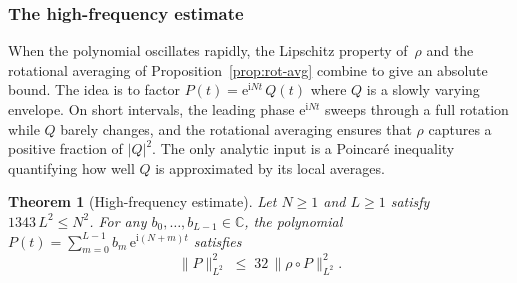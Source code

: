 \documentclass[11pt]{amsart}
\newtheorem{theorem}{Theorem}[section]
\theoremstyle{remark}
\begin{document}
\subsubsection{The high-frequency estimate}\label{sec:high-freq}

When the polynomial oscillates rapidly, the Lipschitz property
of~$\rho$ and the rotational averaging of
Proposition~\ref{prop:rot-avg} combine to give an absolute bound.  The idea
is to factor $P(t) = \mathrm{e}^{\mathrm{i} Nt}\, Q(t)$ where $Q$ is a slowly varying
envelope. On short intervals, the leading phase $\mathrm{e}^{\mathrm{i} Nt}$ sweeps through
a full rotation while $Q$ barely changes, and the rotational averaging
ensures that $\rho$ captures a positive fraction of $\lvert Q \rvert^2$.  The only
analytic input is a Poincar\'e inequality quantifying how well $Q$ is
approximated by its local averages.

\begin{theorem}[High-frequency estimate]\label{thm:high-freq} Let $N \ge 1$ and $L \ge 1$ satisfy $1343\, L^2 \le N^2$.
For any $b_0, \dots, b_{L-1} \in \mathbb{C}$, the polynomial
$P(t) = \sum_{m=0}^{L-1} b_m\, \mathrm{e}^{\mathrm{i}(N+m)t}$ satisfies
\[
\lVert P \rVert_{L^2}^2
\;\le\;
32\, \lVert \rho \circ P \rVert_{L^2}^2.
\]
\end{theorem}
\end{document}
